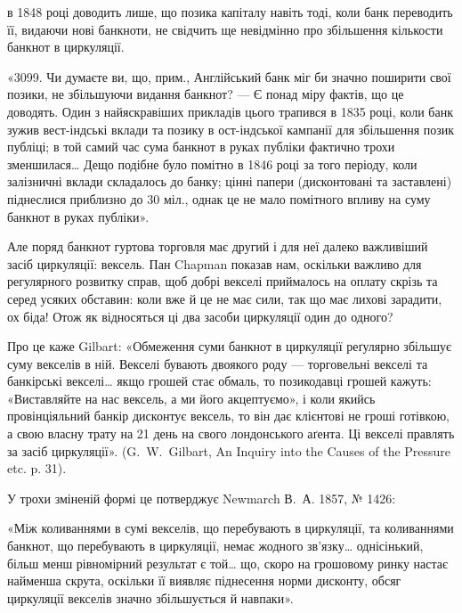 \parcont{}  %
в 1848 році доводить лише, що позика капіталу навіть тоді, коли банк переводить
її, видаючи нові банкноти, не свідчить ще невідмінно про збільшення
кількости банкнот в циркуляції.

«3099. Чи думаєте ви, що, прим., Англійський банк міг би значно поширити
свої позики, не збільшуючи видання банкнот? — Є понад міру фактів, що
це доводять. Один з найяскравіших прикладів цього трапився в 1835 році, коли
банк зужив вест-індські вклади та позику в ост-індської кампанії для збільшення
позик публіці; в той самий час сума банкнот в руках публіки фактично
трохи зменшилася\dots{} Дещо подібне було помітно в 1846 році за того періоду,
коли залізничні вклади складалось до банку; цінні папери (дисконтовані та
заставлені) піднеслися приблизно до 30 міл., однак це не мало помітного
впливу на суму банкнот в руках публіки».

Але поряд банкнот гуртова торговля має другий і для неї далеко важливіший
засіб циркуляції: вексель. Пан Chapman показав нам, оскільки важливо
для регулярного розвитку справ, щоб добрі векселі приймалось на оплату скрізь
та серед усяких обставин: коли вже й це не має сили, так що має лихові
зарадити, ох біда! Отож як відносяться ці два засоби циркуляції один до одного?

Про це каже Gilbart: «Обмеження суми банкнот в циркуляції реґулярно
збільшує суму векселів в ній. Векселі бувають двоякого роду — торговельні
векселі та банкірські векселі\dots{} якщо грошей стає обмаль, то позикодавці
грошей кажуть: «Виставляйте на нас вексель, а ми його акцептуємо», і коли
якийсь провінціяльний банкір дисконтує вексель, то він дає клієнтові не гроші
готівкою, а свою власну трату на 21 день на свого лондонського аґента. Ці
векселі правлять за засіб циркуляції». (G.~W.~Gilbart, An Inquiry into the Causes
of the Pressure etc. p. 31).

У трохи зміненій формі це потверджує Newmarch В.~А. 1857, № 1426:

«Між коливаннями в сумі векселів, що перебувають в циркуляції, та
коливаннями банкнот, що перебувають в циркуляції, немає жодного зв’язку\dots{}
однісінький, більш менш рівномірний результат є той\dots{} що, скоро на грошовому
ринку настає найменша скрута, оскільки її виявляє піднесення норми дисконту,
обсяг циркуляції векселів значно збільшується й навпаки».

